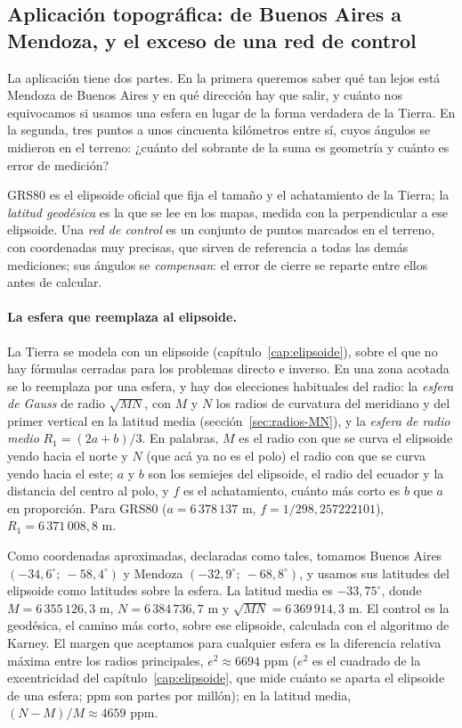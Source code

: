\subsection{Aplicación topográfica: de Buenos Aires a Mendoza, y el exceso de una red de control}

La aplicación tiene dos partes. En la primera queremos saber qué tan lejos está Mendoza de
Buenos Aires y en qué dirección hay que salir, y cuánto nos equivocamos si usamos una esfera en
lugar de la forma verdadera de la Tierra. En la segunda, tres puntos a unos cincuenta
kilómetros entre sí, cuyos ángulos se midieron en el terreno: ¿cuánto del sobrante de la suma
es geometría y cuánto es error de medición?

\begin{idea}
GRS80 es el elipsoide oficial que fija el tamaño y el achatamiento de la Tierra; la
\emph{latitud geodésica} es la que se lee en los mapas, medida con la perpendicular a ese
elipsoide. Una \emph{red de control} es un conjunto de puntos marcados en el terreno, con
coordenadas muy precisas, que sirven de referencia a todas las demás mediciones; sus ángulos se
\emph{compensan}: el error de cierre se reparte entre ellos antes de calcular.
\end{idea}

\paragraph{La esfera que reemplaza al elipsoide.} La Tierra se modela con un elipsoide
(capítulo~\ref{cap:elipsoide}), sobre el que no hay fórmulas cerradas para los problemas
directo e inverso. En una zona acotada se lo reemplaza por una esfera, y hay dos elecciones
habituales del radio: la \emph{esfera de Gauss} de radio \(\sqrt{MN}\), con \(M\) y \(N\) los
radios de curvatura del meridiano y del primer vertical en la latitud media
(sección~\ref{sec:radios-MN}), y la \emph{esfera de radio medio} \(R_1=(2a+b)/3\). En palabras,
\(M\) es el radio con que se curva el elipsoide yendo hacia el norte y \(N\) (que acá ya no es
el polo) el radio con que se curva yendo hacia el este; \(a\) y \(b\) son los semiejes del
elipsoide, el radio del ecuador y la distancia del centro al polo, y \(f\) es el achatamiento,
cuánto más corto es \(b\) que \(a\) en proporción. Para GRS80
(\(a=6\,378\,137\) m, \(f=1/298{,}257222101\)), \(R_1=6\,371\,008{,}8\) m.

Como coordenadas aproximadas, declaradas como tales, tomamos Buenos Aires
\((-34{,}6^\circ;\ -58{,}4^\circ)\) y Mendoza \((-32{,}9^\circ;\ -68{,}8^\circ)\), y usamos
sus latitudes del elipsoide como latitudes sobre la esfera. La latitud media es
\(-33{,}75^\circ\), donde \(M=6\,355\,126{,}3\) m, \(N=6\,384\,736{,}7\) m y
\(\sqrt{MN}=6\,369\,914{,}3\) m. El control es la geodésica, el camino más corto, sobre ese
elipsoide, calculada con el algoritmo de Karney. El margen que aceptamos para cualquier
esfera es la diferencia relativa máxima entre los radios principales, \(e^2\approx6694\) ppm
(\(e^2\) es el cuadrado de la excentricidad del capítulo~\ref{cap:elipsoide}, que mide cuánto
se aparta el elipsoide de una esfera; ppm son partes por millón); en la latitud media,
\((N-M)/M\approx4659\) ppm.

